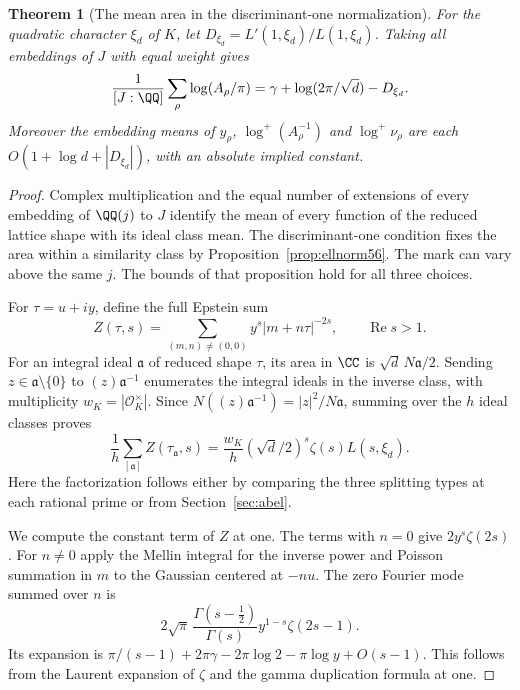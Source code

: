 \documentclass[a4paper,11pt]{article}
\newtheorem{theorem}[proposition]{Theorem}
\theoremstyle{definition}
\theoremstyle{remark}
\newcommand{\real}{\operatorname{Re}}\newcommand{\imag}{\operatorname{Im}}
\numberwithin{equation}{section}
\begin{document}
\begin{theorem}[The mean area in the discriminant-one normalization]\label{thm:mean56}
For the quadratic character \(\xi_d\) of \(K\), let
\(D_{\xi_d}=L'(1,\xi_d)/L(1,\xi_d)\).
Taking all embeddings of \(J\) with equal weight gives
\begin{equation}
 \frac{1}{[J:\QQ]}\sum_\rho\log(A_\rho/\pi)
       =\gamma+\log(2\pi/\sqrt d)-D_{\xi_d}.           \label{eq:mean56}
\end{equation}
Moreover the embedding means of \(y_\rho\), \(\log^+(A_\rho^{-1})\)
and \(\log^+\nu_\rho\) are each
\(O(1+\log d+|D_{\xi_d}|)\), with an absolute implied constant.
\end{theorem}
\begin{proof}
Complex multiplication and the equal number of extensions of every
embedding of \(\QQ(j)\) to \(J\) identify the mean of every
function of the reduced lattice shape with its ideal class mean.
The discriminant-one condition fixes the area within a similarity
class by Proposition~\ref{prop:ellnorm56}. The mark can vary above
the same \(j\). The bounds of that proposition hold for all three
choices.

For \(\tau=u+iy\), define the full Epstein sum
\[
       Z(\tau,s)=\sum_{(m,n)\ne(0,0)}y^s|m+n\tau|^{-2s},
                     \qquad \real s>1.
\]
For an integral ideal \(\mathfrak a\) of reduced shape \(\tau\),
its area in \(\CC\) is \(\sqrt d\,N\mathfrak a/2\). Sending
\(z\in\mathfrak a\setminus\{0\}\) to
\((z)\mathfrak a^{-1}\) enumerates the integral ideals in the
inverse class, with multiplicity \(w_K=|\mathcal O_K^\times|\).
Since \(N((z)\mathfrak a^{-1})=|z|^2/N\mathfrak a\), summing
over the \(h\) ideal classes proves
\[
         \frac1h\sum_{[\mathfrak a]} Z(\tau_{\mathfrak a},s)
       =\frac{w_K}{h}(\sqrt d/2)^s\zeta(s)L(s,\xi_d).
\]
Here the factorization follows either by comparing the three
splitting types at each rational prime or from
Section~\ref{sec:abel}.

We compute the constant term of \(Z\) at one. The terms with
\(n=0\) give \(2y^s\zeta(2s)\). For \(n\ne0\) apply the Mellin
integral for the inverse power and Poisson summation in \(m\)
to the Gaussian centered at \(-nu\). The zero Fourier mode
summed over \(n\) is
\[
  2\sqrt\pi\,\frac{\Gamma(s-\tfrac12)}{\Gamma(s)}
                   y^{1-s}\zeta(2s-1).
\]
Its expansion is
\(\pi/(s-1)+2\pi\gamma-2\pi\log2-\pi\log y+O(s-1)\).
This follows from the Laurent expansion of \(\zeta\) and the
gamma duplication formula at one.


\end{proof}
\end{document}
